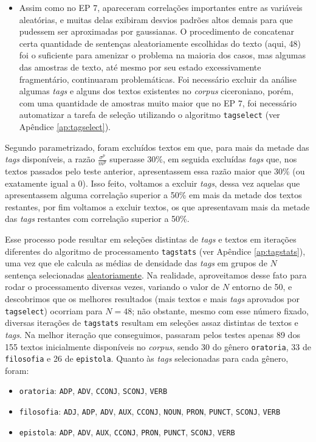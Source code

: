 \documentclass[10pt,a4paper,onecolumn]{article}
\theoremstyle{definition}
\theoremstyle{remark}
\begin{document}
\begin{itemize}
	\item Assim como no EP 7, apareceram correlações importantes entre as variáveis aleatórias, e muitas delas exibiram desvios padrões altos demais para que pudessem ser aproximadas por gaussianas. O procedimento de concatenar certa quantidade de sentenças aleatoriamente escolhidas do texto (aqui, 48) foi o suficiente para amenizar o problema na maioria dos casos, mas algumas das amostras de texto, até mesmo por seu estado excessivamente fragmentário, continuaram problemáticas. Foi necessário excluir da análise algumas \emph{tags} e alguns dos textos existentes no \emph{corpus} ciceroniano, porém, com uma quantidade de amostras muito maior que no EP 7, foi necessário automatizar a tarefa de seleção utilizando o algoritmo \texttt{tagselect} (ver Apêndice \ref{ap:tagselect}). 
\end{itemize}
	
Segundo parametrizado, foram excluídos textos em que, para mais da metade das \emph{tags} disponíveis, a razão $\frac{\sigma^p}{m^p}$ superasse 30\%, em seguida excluídas \emph{tags} que, nos textos passados pelo teste anterior, apresentassem essa razão maior que 30\% (ou exatamente igual a 0). Isso feito, voltamos a excluir \emph{tags}, dessa vez aquelas que apresentassem alguma correlação superior a 50\% em mais da metade dos textos restantes, por fim voltamos a excluir textos, os que apresentavam mais da metade das \emph{tags} restantes com correlação superior a 50\%.

Esse processo pode resultar em seleções distintas de \emph{tags} e textos em iterações diferentes do algoritmo de processamento \texttt{tagstats} (ver Apêndice \ref{ap:tagstats}), uma vez que ele calcula as médias de densidade das \emph{tags} em grupos de $N$ sentença selecionadas \underline{aleatoriamente}. Na realidade, aproveitamos desse fato para rodar o processamento diversas vezes, variando o valor de $N$ entorno de 50, e descobrimos que os melhores resultados (mais textos e mais \emph{tags} aprovados por \texttt{tagselect}) ocorriam para $N = 48$; não obstante, mesmo com esse número fixado, diversas iterações de \texttt{tagstats} resultam em seleções assaz distintas de textos e \emph{tags}. Na melhor iteração que conseguimos, passaram pelos testes apenas 89 dos 155 textos inicialmente disponíveis no \emph{corpus}, sendo 30 do gênero \texttt{oratoria}, 33 de \texttt{filosofia} e 26 de \texttt{epistola}. Quanto às \emph{tags} selecionadas para cada gênero, foram:
\begin{itemize}
	\item[] \texttt{oratoria}: \texttt{ADP}, \texttt{ADV}, \texttt{CCONJ}, \texttt{SCONJ}, \texttt{VERB}
	\item[] \texttt{filosofia}: \texttt{ADJ}, \texttt{ADP}, \texttt{ADV}, \texttt{AUX}, \texttt{CCONJ}, \texttt{NOUN}, \texttt{PRON}, \texttt{PUNCT}, \texttt{SCONJ}, \texttt{VERB}
	\item[] \texttt{epistola}: \texttt{ADP}, \texttt{ADV}, \texttt{AUX}, \texttt{CCONJ}, \texttt{PRON}, \texttt{PUNCT}, \texttt{SCONJ}, \texttt{VERB}
\end{itemize}
\end{document}

